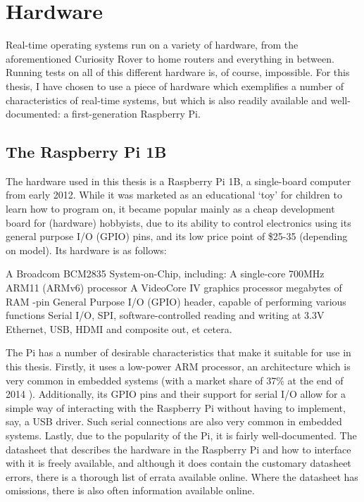 \documentclass[twoside]{uva-inf-bachelor-thesis}
\begin{document}
\section{Hardware}
Real-time operating systems run on a variety of hardware, from the aforementioned Curiosity Rover to home routers and everything in between. Running tests on all of this different hardware is, of course, impossible. For this thesis, I have chosen to use a piece of hardware which exemplifies a number of characteristics of real-time systems, but which is also readily available and well-documented: a first-generation Raspberry Pi.

\subsection{The Raspberry Pi 1B}
The hardware used in this thesis is a Raspberry Pi 1B, a single-board computer from early 2012. While it was marketed as an educational `toy' for children to learn how to program on, it became popular mainly as a cheap development board for (hardware) hobbyists, due to its ability to control electronics using its general purpose I/O (GPIO) pins, and its low price point of \$25-35 (depending on model). Its hardware is as follows:

\begin{outline}
    \1 A Broadcom BCM2835 System-on-Chip, including:
        \2 A single-core 700MHz ARM11 (ARMv6) processor
        \2 A VideoCore IV graphics processor
         megabytes of RAM
    -pin General Purpose I/O (GPIO) header, capable of performing various functions
        \2 Serial I/O, SPI, software-controlled reading and writing at 3.3V
    \1 Ethernet, USB, HDMI and composite out, et cetera.
\end{outline}

The Pi has a number of desirable characteristics that make it suitable for use in this thesis. Firstly, it uses a low-power ARM processor, an architecture which is very common in embedded systems (with a market share of 37\% at the end of 2014 \cite{arm:embeddedmarketshare}). Additionally, its GPIO pins and their support for serial I/O allow for a simple way of interacting with the Raspberry Pi without having to implement, say, a USB driver. Such serial connections are also very common in embedded systems. Lastly, due to the popularity of the Pi, it is fairly well-documented. The datasheet that describes the hardware in the Raspberry Pi and how to interface with it is freely available\cite{bcm:2835peripherals}, and although it does contain the customary datasheet errors, there is a thorough list of errata available online\cite{bcm:2835errata}. Where the datasheet has omissions, there is also often information available online.
\end{document}
